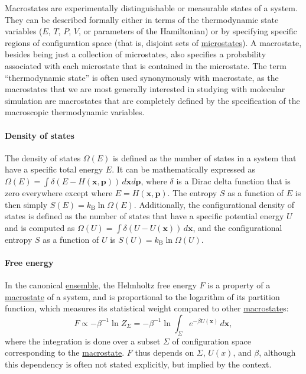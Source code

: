 \documentclass[9pt,review]{livecoms}
\newcommand{\vx}{\mathbf{x}}
\newcommand{\vp}{\mathbf{p}}
\begin{document}
Macrostates are experimentally distinguishable or measurable states of a system.
They can be described formally either in terms of the thermodynamic state variables ($E$, $T$, $P$, $V$, or parameters of the Hamiltonian) or by specifying specific regions of configuration space (that is, disjoint sets of \hyperlink{ref:Microstate} {microstates}). A macrostate, besides being just a collection of microstates, also specifies a probability associated with each microstate that is contained in the microstate. The term ``thermodynamic state'' is often used synonymously with macrostate, as the macrostates that we are most generally interested in studying with molecular simulation are macrostates that are completely defined by the specification of the macroscopic thermodynamic variables.

\hypertarget{ref:density_of_states}{\paragraph{Density of states}}
The density of states $\Omega(E)$ is defined as the number of states in a system that have a specific total energy $E$.  It can be mathematically expressed as $\Omega(E) = \int \delta(E-H(\vx,\vp))\, d\vx d\vp$, where $\delta$ is a Dirac delta function that is zero everywhere except where $E=H(\vx,\vp)$. The entropy $S$ as a function of $E$ is then simply $S(E)=k_\mathrm{B} \ln \Omega(E)$. Additionally, the configurational density of states is defined as the number of states that have a specific potential energy $U$ and is computed as $\Omega(U) = \int \delta(U-U(\vx))\, d\vx$, and the configurational entropy $S$ as a function of $U$ is $S(U)=k_\mathrm{B} \ln \Omega(U)$.

\hypertarget{ref:FE} {\paragraph{Free energy}}
In the canonical \hyperlink{ref:Ensemble} {ensemble}, the Helmholtz free energy $F$ is a property of a \hyperlink{ref:Macrostate} {macrostate} of a system, and is proportional to the logarithm of its partition function, which measures its statistical weight compared to other \hyperlink{ref:Macrostate} {macrostate}s:
\begin{equation}
F \propto -\beta^{-1} \ln Z_{\Sigma} = -\beta^{-1} \ln \int_\Sigma e^{-\beta U(\vx)} \, d\vx,
\end{equation}
where the integration is done over a subset $\Sigma$ of configuration space corresponding to the \hyperlink{ref:Macrostate} {macrostate}. $F$ thus depends on $\Sigma$, $U(x)$, and $\beta$, although this dependency is often not stated explicitly, but implied by the context.
\end{document}

